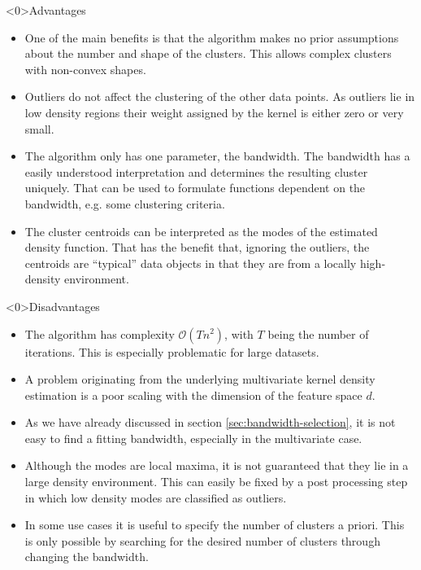 \documentclass[18pt]{beamer}
\begin{document}
\begin{frame}<0>{Advantages}
\begin{itemize}
	\item One of the main benefits is that the algorithm makes no prior assumptions about the number and shape of the clusters. This allows complex clusters with non-convex shapes.
	
	\item Outliers do not affect the clustering of the other data points. As outliers lie in low density regions their weight assigned by the kernel is either zero or very small.
	
	\item The algorithm only has one parameter, the bandwidth. The bandwidth has a easily understood interpretation and determines the resulting cluster uniquely. That can be used to formulate functions dependent on the bandwidth, e.g. some clustering criteria.
	
	\item The cluster centroids can be interpreted as the modes of the estimated density function. That has the benefit that, ignoring the outliers, the centroids are ``typical'' data objects in that they are from a locally high-density environment.
\end{itemize}
\end{frame}

\begin{frame}<0>{Disadvantages}
\begin{itemize}
	\item The algorithm has complexity $\mathcal{O}(Tn^2)$, with $T$ being the number of iterations. This is especially problematic for large datasets.
	
	\item A problem originating from the underlying multivariate kernel density estimation is a poor scaling with the dimension of the feature space $d$.
	
	\item As we have already discussed in section \ref{sec:bandwidth-selection}, it is not easy to find a fitting bandwidth, especially in the multivariate case.
	
	\item Although the modes are local maxima, it is not guaranteed that they lie in a large density environment. This can easily be fixed by a post processing step in which low density modes are classified as outliers.
	
	\item In some use cases it is useful to specify the number of clusters a priori. This is only possible by searching for the desired number of clusters through changing the bandwidth.
\end{itemize}
\end{frame}
\end{document}
